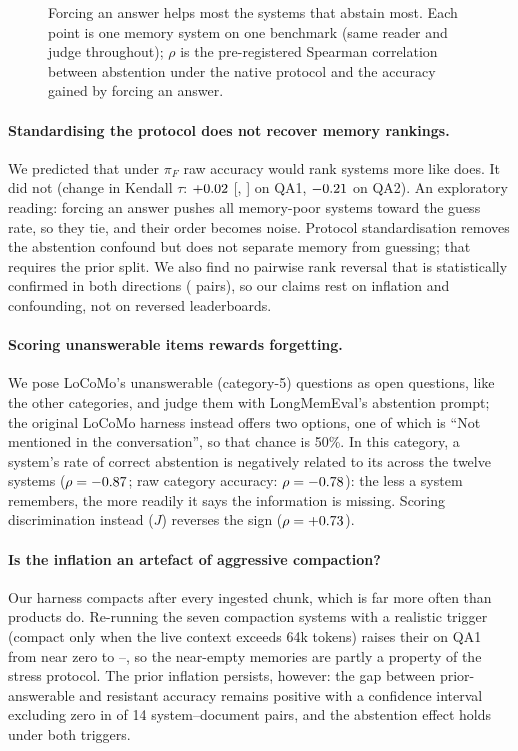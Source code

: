 \begin{figure}[t]
\centering

\caption{Forcing an answer helps most the systems that abstain most. Each point is one memory system
on one benchmark (same reader and judge throughout); $\rho$ is the pre-registered Spearman correlation between
abstention under the native protocol and the accuracy gained by forcing an answer.}
\label{fig:abstention}
\end{figure}

\paragraph{Standardising the protocol does not recover memory rankings.} We predicted that under $\pi_F$ raw accuracy
would rank systems more like \cpr{} does. It did not (change in Kendall $\tau$: $+0.02$ [\dtauQaOneLo, \dtauQaOneHi]
on QA1, $-0.21$ on QA2). An exploratory reading: forcing an answer pushes all memory-poor systems toward the guess
rate, so they tie, and their order becomes noise. Protocol standardisation removes the abstention confound but does
not separate memory from guessing; that requires the prior split. We also find no pairwise rank reversal that is
statistically confirmed in both directions (\confirmedRev{} pairs), so our claims rest on inflation and confounding,
not on reversed leaderboards.

\paragraph{Scoring unanswerable items rewards forgetting.} We pose LoCoMo's unanswerable (category-5) questions as open
questions, like the other categories, and judge them with LongMemEval's abstention prompt; the original LoCoMo harness
instead offers two options, one of which is ``Not mentioned in the conversation'', so that chance is 50\%. In this category, a system's rate of correct
abstention is negatively related to its \cpr{} across the twelve systems ($\rho=-0.87$; raw category accuracy:
$\rho=-0.78$): the less a system remembers, the more readily it says the information is missing. Scoring
discrimination instead ($J$) reverses the sign ($\rho=+0.73$).

\paragraph{Is the inflation an artefact of aggressive compaction?} Our harness compacts after every ingested chunk,
which is far more often than products do. Re-running the seven compaction systems with a realistic trigger (compact
only when the live context exceeds 64k tokens) raises their \cpr{} on QA1 from near zero to
\thrCprMin--\thrCprMax{}, so the near-empty memories are partly a property of the stress protocol. The prior inflation
persists, however: the gap between prior-answerable and resistant accuracy remains positive with a confidence interval
excluding zero in \inflPairs{} of 14 system--document pairs, and the abstention effect holds under both triggers.
